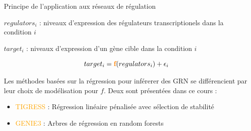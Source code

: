 	
\begin{frame}{Principe de l'application aux réseaux de régulation}
    	
    	\begin{center}
    	\scriptsize 
    	$regulators_{i}$ : niveaux d'expression des régulateurs transcriptionels dans la condition $i$
    	
    	$target_{i}$  : niveaux d'expression d'un gène cible dans la condition $i$
    	\end{center}
    	\vspace{-0.15cm}
    	
    	\begin{block}{}
    	\begin{equation*}
    	    target_{i} = \textcolor{orange}{\textbf{f}}(regulators_{i}) + \epsilon_i
    	\end{equation*}
    	\end{block}
    	\vspace{0.25cm}

    	\scriptsize 
    	Les méthodes basées sur la régression pour inférerer des GRN se différencient par leur choix de modélisation pour $f$.
    	Deux sont présentées dans ce cours : 
    	\vspace{0.25cm}
    	
    	\begin{itemize}
    	    \item \textcolor{orange}{TIGRESS} : Régression linéaire pénalisée avec sélection de stabilité \cite{haury2012tigress}
    	    \item \textcolor{orange}{GENIE3} : Arbres de régression en random forests \cite{genie3}
    	\end{itemize}
\end{frame}
	
